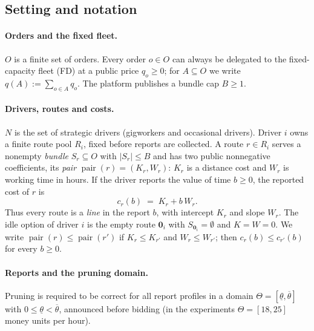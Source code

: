 \documentclass[11pt]{article}
\theoremstyle{definition}
\theoremstyle{remark}
\newcommand{\thl}{\underline{\theta}}
\newcommand{\thu}{\overline{\theta}}
\newcommand{\idle}{\mathbf{0}}
\newcommand{\pair}{\operatorname{pair}}
\begin{document}
\subsection{Setting and notation}
\label{sec:setting}

\paragraph{Orders and the fixed fleet.}
$O$ is a finite set of orders. Every order $o\in O$ can always be delegated to
the fixed-capacity fleet (FD) at a public price $q_o\ge 0$; for $A\subseteq O$
we write $q(A):=\sum_{o\in A}q_o$. The platform publishes a bundle cap $B\ge1$.

\paragraph{Drivers, routes and costs.}
$N$ is the set of strategic drivers (gigworkers and occasional drivers). Driver
$i$ owns a finite route pool $R_i$, fixed before reports are collected. A route
$r\in R_i$ serves a nonempty \emph{bundle} $S_r\subseteq O$ with $|S_r|\le B$
and has two public nonnegative coefficients, its \emph{pair}
$\pair(r)=(K_r,W_r)$: $K_r$ is a distance cost and $W_r$ is working time in
hours. If the driver reports the value of time $b\ge 0$, the reported cost of
$r$ is
\begin{equation}\label{eq:cost}
  c_r(b)\;=\;K_r+b\,W_r .
\end{equation}
Thus every route is a \emph{line} in the report $b$, with intercept $K_r$ and
slope $W_r$. The idle option of driver $i$ is the empty route $\idle_i$ with
$S_{\idle_i}=\emptyset$ and $K=W=0$. We write
$\pair(r)\le\pair(r')$ if $K_r\le K_{r'}$ and $W_r\le W_{r'}$; then
$c_r(b)\le c_{r'}(b)$ for every $b\ge0$.

\paragraph{Reports and the pruning domain.}
Pruning is required to be correct for all report profiles in a domain
$\Theta=[\thl,\thu]$ with $0\le\thl<\thu$, announced before bidding (in the
experiments $\Theta=[18,25]$ money units per hour).
\end{document}
